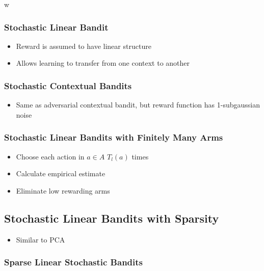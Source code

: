 w\documentclass{article}
\begin{document}
\subsubsection{Stochastic Linear Bandit}
\begin{itemize}
	\item Reward is assumed to have linear structure
	\item Allows learning to transfer from one context to another
\end{itemize}
\subsubsection{Stochastic Contextual Bandits}
\begin{itemize}
	\item Same as adversarial contextual bandit, but reward function has 1-subgaussian noise
\end{itemize}
\subsubsection{Stochastic Linear Bandits with Finitely Many Arms}
\begin{itemize}
	\item Choose each action in $a \in A$ $T_{l}(a)$ times
	\item Calculate empirical estimate
	\item Eliminate low rewarding arms
\end{itemize}
\subsection{Stochastic Linear Bandits with Sparsity}
\begin{itemize}
 	\item Similar to PCA 
\end{itemize}
\subsubsection{Sparse Linear Stochastic Bandits}
\end{document}
